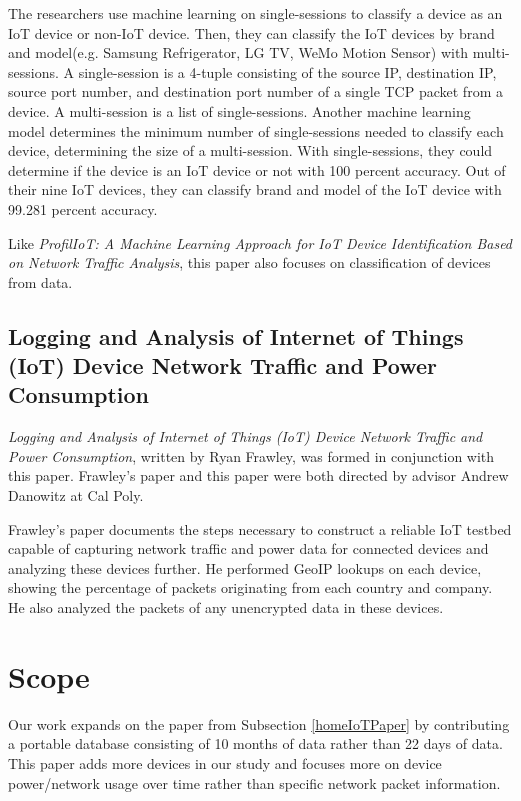 The researchers use machine learning on single-sessions to classify a device as an IoT device or non-IoT device. Then, they can classify the IoT devices by brand and model(e.g. Samsung Refrigerator, LG TV, WeMo Motion Sensor) with multi-sessions. A single-session is a 4-tuple consisting of the source IP, destination IP, source port number, and destination port number of a single TCP packet from a device. A multi-session is a list of single-sessions. Another machine learning model determines the minimum number of single-sessions needed to classify each device, determining the size of a multi-session. With single-sessions, they could determine if the device is an IoT device or not with 100 percent accuracy. Out of their nine IoT devices, they can classify brand and model of the IoT device with 99.281 percent accuracy.

Like \textit{ProfilIoT: A Machine Learning Approach for IoT Device Identification Based on Network Traffic Analysis}, this paper also focuses on classification of devices from data.

\subsection{Logging and Analysis of Internet of Things (IoT) Device Network Traffic and Power Consumption}
\label{frawleyPaper}
\textit{Logging and Analysis of Internet of Things (IoT) Device Network Traffic and Power Consumption}\cite{frawley_2018}, written by Ryan Frawley, was formed in conjunction with this paper. Frawley's paper and this paper were both directed by advisor Andrew Danowitz at Cal Poly.

Frawley's paper documents the steps necessary to construct a reliable IoT testbed capable of capturing network traffic and power data for connected devices and analyzing these devices further. He performed GeoIP\cite{maxmind} lookups on each device, showing the percentage of packets originating from each country and company. He also analyzed the packets of any unencrypted data in these devices.

\section{Scope}
\label{Scope}
Our work expands on the paper from Subsection \ref{homeIoTPaper} by contributing a portable database consisting of 10 months of data rather than 22 days of data. This paper adds more devices in our study and focuses more on device power/network usage over time rather than specific network packet information.

